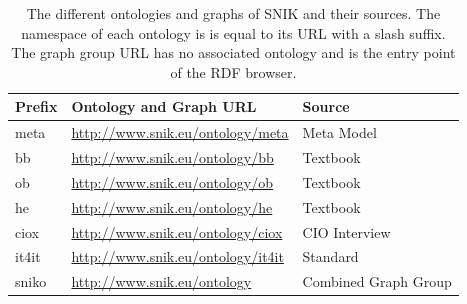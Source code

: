 \documentclass{IOS-Book-Article}     %
\begin{document}
\begin{table}[tbh]
\caption{The different ontologies and graphs of SNIK and their sources.
The namespace of each ontology is is equal to its URL with a slash suffix.
The graph group URL has no associated ontology and is the entry point of the RDF browser.
}
\label{tab:source}
\begin{center}
\begin{tabular}{lll}
\toprule
\textbf{Prefix}	&\textbf{Ontology and Graph URL}			&\textbf{Source}\\		
\midrule
meta			&\url{http://www.snik.eu/ontology/meta}		&Meta Model\\
bb				&\url{http://www.snik.eu/ontology/bb}		&Textbook~\cite{bb}\\
ob				&\url{http://www.snik.eu/ontology/ob}		&Textbook~\cite{ob}\\
he				&\url{http://www.snik.eu/ontology/he}		&Textbook~\cite{he}\\
ciox			&\url{http://www.snik.eu/ontology/ciox}		&CIO Interview\\
it4it			&\url{http://www.snik.eu/ontology/it4it}	&Standard~\cite{it4it}\\
\midrule
sniko			&\url{http://www.snik.eu/ontology}			&Combined Graph Group\\
\bottomrule
\end{tabular}
\end{center}
\end{table}
\end{document}
